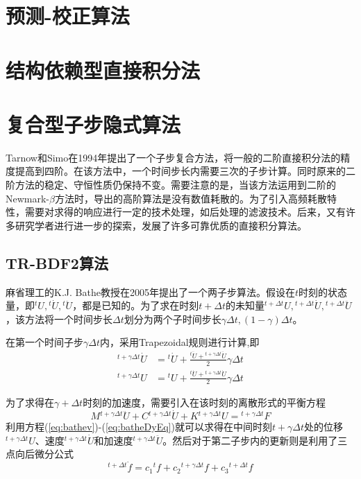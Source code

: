 \section{预测-校正算法}


\section{结构依赖型直接积分法}

\section{复合型子步隐式算法}
Tarnow和Simo在1994年提出了一个子步复合方法\cite{Tarnow1994}，将一般的二阶直接积分法的精度提高到四阶。在该方法中，一个时间步长内需要三次的子步计算。同时原来的二阶方法的稳定、守恒性质仍保持不变。需要注意的是，当该方法运用到二阶的Newmark-$\beta$方法\cite{Newmark1959}时，导出的高阶算法是没有数值耗散的。为了引入高频耗散特性，需要对求得的响应进行一定的技术处理，如后处理的滤波技术\cite{Fung1998}。后来，又有许多研究学者进行进一步的探索，发展了许多可靠优质的直接积分算法。
\subsection{TR-BDF2算法}
麻省理工的K.J. Bathe教授在2005年提出了一个两子步算法\cite{Bathe2005,Bathe2007,Bathe2012a}。假设在$t$时刻的状态量，即$^{t}\!U,{^{t}\!\dot{U}},{^{t}\!\ddot{U}}$，都是已知的。为了求在时刻$t+\Delta t$的未知量$^{t+\Delta t}\!U,{^{t+\Delta t}\!\dot{U}},{^{t+\Delta t}\!\ddot{U}}$，该方法将一个时间步长$\Delta t$划分为两个子时间步长$\gamma\Delta t,(1-\gamma)\Delta t$。

在第一个时间子步$\gamma\Delta t$内，采用Trapezoidal规则\cite{book:dover}进行计算,即
\begin{align}
{^{t+\gamma\Delta t}\!\dot{U}}&={^{t}\!\dot{U}}+\frac{{^t\!\ddot{U}}+{^{t+\gamma\Delta t}\!\ddot{U}}}{2}\gamma\Delta t\label{eq:bathev}\\
{^{t+\gamma\Delta t}\!{U}}&={^{t}\!U}+\frac{{^t\!\dot{U}}+{^{t+\gamma\Delta t}\!\dot{U}}}{2}\gamma\Delta t\label{eq:bathed}
\end{align}

为了求得在$\gamma+\Delta t$时刻的加速度，需要引入在该时刻的离散形式的平衡方程
\begin{equation}
	M{^{t+\gamma\Delta t}\!\ddot{U}}+C{^{t+\gamma\Delta t}\!\dot{U}}+K{^{t+\gamma\Delta t}\!U}={^{t+\gamma\Delta t}\!F}\label{eq:batheDyEq}
\end{equation}
利用方程(\ref{eq:bathev})-(\ref{eq:batheDyEq})就可以求得在中间时刻$t+\gamma\Delta t$处的位移${^{t+\gamma\Delta t}\!U}$、速度${^{t+\gamma\Delta t}\!\dot{U}}$和加速度${^{t+\gamma\Delta t}\!\ddot{U}}$。然后对于第二子步内的更新则是利用了三点向后微分公式\cite{Bathe2005}
\begin{equation}	
	{^{t+\Delta t}\!\dot{f}}=c_1{^t\!f}+c_2{^{t+\gamma\Delta t}\!f}+c_3{^{t+\Delta t}\!f}
\end{equation}

